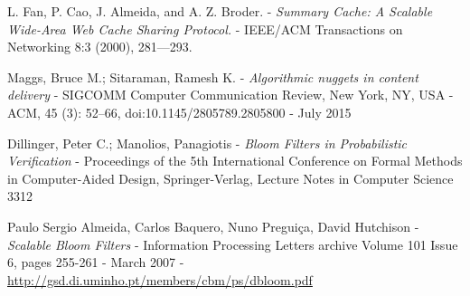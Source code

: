 \begin{thebibliography}{99}
	L. Fan, P. Cao, J. Almeida, and A. Z. Broder. -
	\emph{Summary Cache: A Scalable Wide-Area Web Cache Sharing Protocol.} -
	IEEE/ACM Transactions on Networking 8:3 (2000), 281—293.

	Maggs, Bruce M.; Sitaraman, Ramesh K. -
	\emph{Algorithmic nuggets in content delivery} -
	SIGCOMM Computer Communication Review, New York, NY, USA -
	ACM, 45 (3): 52–66, doi:10.1145/2805789.2805800 -
	July 2015

	Dillinger, Peter C.; Manolios, Panagiotis - 
	\emph{Bloom Filters in Probabilistic Verification} -
	Proceedings of the 5th International Conference on Formal Methods in Computer-Aided Design, Springer-Verlag, Lecture Notes in Computer Science 3312

	Paulo Sergio Almeida, Carlos Baquero, Nuno Preguiça, David Hutchison -
	\emph{Scalable Bloom Filters} -
	Information Processing Letters archive Volume 101 Issue 6, pages 255-261 -
	March 2007 -
	\url{http://gsd.di.uminho.pt/members/cbm/ps/dbloom.pdf}

\end{thebibliography}
